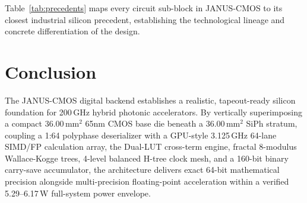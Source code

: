 \documentclass[10pt,journal,compsoc]{IEEEtran}
\begin{document}
Table~\ref{tab:precedents} maps every circuit sub-block in JANUS-CMOS to its closest industrial silicon precedent, establishing the technological lineage and concrete differentiation of the design.

\section{Conclusion}\label{sec:conclusion}
The JANUS-CMOS digital backend establishes a realistic, tapeout-ready silicon foundation for 200\,GHz hybrid photonic accelerators. By vertically superimposing a compact $36.00\,\text{mm}^2$ 65nm CMOS base die beneath a $36.00\,\text{mm}^2$ SiPh stratum, coupling a 1:64 polyphase deserializer with a GPU-style 3.125\,GHz 64-lane SIMD/FP calculation array, the Dual-LUT cross-term engine, fractal 8-modulus Wallace-Kogge trees, 4-level balanced H-tree clock mesh, and a 160-bit binary carry-save accumulator, the architecture delivers exact 64-bit mathematical precision alongside multi-precision floating-point acceleration within a verified 5.29--6.17\,W full-system power envelope.



\end{document}

